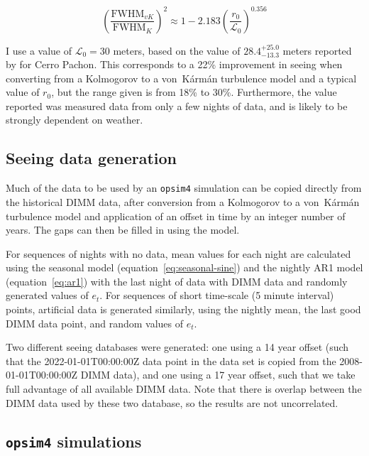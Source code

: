 \documentclass[\docopts]{\docclass}
\begin{document}
\begin{equation} \label{eq:ktovk}
\left( \frac{\mbox{FWHM}_{vK}}{\mbox{FWHM}_{K}} \right)^2
\approx 1 - 2.183 \left( \frac{r_0}{\mathcal{L}_0} \right)^{0.356}
\end{equation}

I use a value of $\mathcal{L}_0 = 30$ meters, based on the
value of $28.4^{+25.0}_{-13.3}$ meters reported by
\cite{2000ApOpt..39.5415Z} for Cerro Pachon. This corresponds to a 22\%
improvement in seeing when converting from a Kolmogorov to a
von~K\'arm\'an turbulence model and a typical value of $r_0$, but the
range given is from 18\% to 30\%. Furthermore, the value reported was
measured data from only a few nights of data, and is likely to be
strongly dependent on weather.

\subsection{Seeing data generation}
\label{sec:data-generation}

Much of the data to be used by an \texttt{opsim4} simulation can be copied
directly from the historical DIMM data, after conversion from a
Kolmogorov to a von~K\'arm\'an turbulence model and application of an
offset in time by an integer number of years. The gaps can then be
filled in using the model.

For sequences of nights with no data, mean values for each night are
calculated using the seasonal model (equation~\ref{eq:seasonal-sine})
and the nightly AR1 model (equation~\ref{eq:ar1}) with the last night
of data with DIMM data and randomly generated values of $e_t$. For
sequences of short time-scale (5 minute interval) points, artificial
data is generated similarly, using the nightly mean, the last good
DIMM data point, and random values of $e_t$.

Two different seeing databases were generated: one using a 14 year
offset (such that the 2022-01-01T00:00:00Z data point in the data set
is copied from the 2008-01-01T00:00:00Z DIMM data), and one using a 17
year offset, such that we take full advantage of all available DIMM
data. Note that there is overlap between the DIMM data used by these
two database, so the results are not uncorrelated.

\subsection{\texttt{opsim4} simulations}
\label{sec:simulations}
\end{document}
